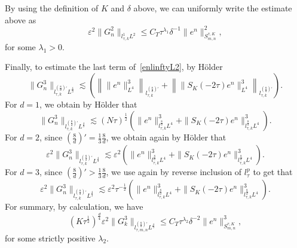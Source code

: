 \documentclass[10pt,a4paper]{article}
\begin{document}
  By using the definition of \(K\) and \(\delta\) above, we can uniformly write
  the estimate above as 
  \begin{equation}\label{G2}
    \varepsilon^2\|G_n^2\|_{l^1_{\tau,k}L^2} \leq C_T \tau^{\lambda_1}
    \delta^{-1} \|e^n\|_{S^{\tau,K}_{m,n}}^2,
  \end{equation}
  for some \(\lambda_1 > 0\).

  Finally, to estimate the last term of~\eqref{enlinftyL2}, by H\"older
  \[ \|G_n^3\|_{l^{(\frac8d)'}_{\tau,k}L^\frac43} \lesssim \left(
  \left\| \|e^n\|_{L^4}^3 \right\|_{l^{(\frac8d)'}_{\tau,k}} 
  + \left\| \|S_K(-2\tau)e^n \|_{L^4}^3 \right\|_{l^{(\frac8d)'}_{\tau,k}}\right). \]
  For \(d=1\), we obtain by H\"older that 
  \begin{equation*}%
    \|G_n^3\|_{l^{(\frac8d)'}_{\tau,k}L^\frac43} \lesssim 
    (N\tau)^\frac12 \left(
    \|e^n\|^3_{l^\frac8d_{\tau,k}L^4} + \|S_K(-2\tau)e^n\|_{l^\frac8d_{\tau,k}L^4}^3\right).
  \end{equation*}
  For \(d=2\), since \((\frac8d)' = \frac13\frac8d\), we obtain again by
  H\"older that 
  \begin{equation*}%
    \varepsilon^2 \|G_n^3\|_{l^{(\frac8d)'}_{\tau,k}L^\frac43} \lesssim \varepsilon^2
    \left(\|e^n\|^3_{l^\frac8d_{\tau,k}L^4} + \|S_K(-2\tau)e^n\|_{l^\frac8d_{\tau,k}L^4}^3\right).
  \end{equation*}
  For \(d=3\), since \((\frac8d)' > \frac13\frac8d\), we use again by reverse
  inclusion of \(l^p_\tau\) to get that 
  \begin{equation*}%
    \varepsilon^2 \|G_n^3\|_{l^{(\frac8d)'}_{\tau,k}L^\frac43} \lesssim \varepsilon^2 \tau^{-\frac12}
    \left(\|e^n\|^3_{l^\frac8d_{\tau,k}L^4} + \|S_K(-2\tau)e^n\|_{l^\frac8d_{\tau,k}L^4}^3\right).
  \end{equation*}
  For summary, by calculation, we have 
  \begin{equation}\label{G3}
    (K\tau^\frac12)^\frac d4 
    \varepsilon^2\|G_k^3\|_{l^{(\frac8d)'}_{\tau,m,n}L^\frac43}
    \leq C_T \tau^{\lambda_2} \delta^{-2}
    \|e^n\|_{S^{\tau,K}_{m,n}}^3,
  \end{equation}
  for some strictly positive \(\lambda_2\).
\end{document}
